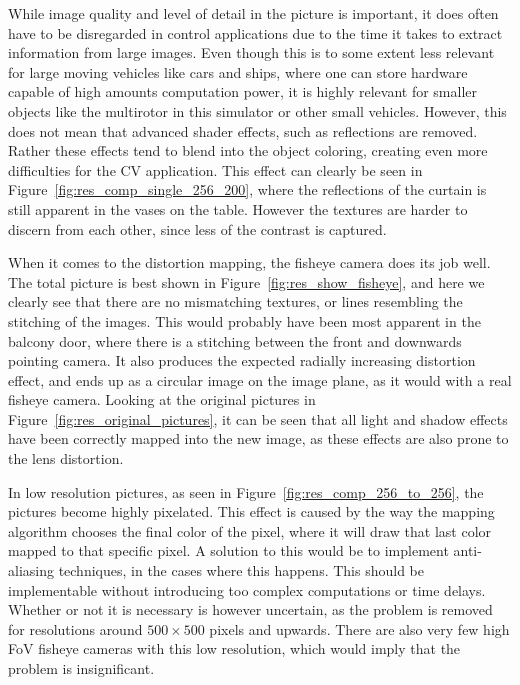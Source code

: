 While image quality and level of detail in the picture is important, it does often have to be disregarded in control applications due to the time it takes to extract information from large images. Even though this is to some extent less relevant for large moving vehicles like cars and ships, where one can store hardware capable of high amounts computation power, it is highly relevant for smaller objects like the multirotor in this simulator or other small vehicles. However, this does not mean that advanced shader effects, such as reflections are removed. Rather these effects tend to blend into the object coloring, creating even more difficulties for the CV application. This effect can clearly be seen in Figure~\ref{fig:res_comp_single_256_200}, where the reflections of the curtain is still apparent in the vases on the table. However the textures are harder to discern from each other, since less of the contrast is captured.

When it comes to the distortion mapping, the fisheye camera does its job well. The total picture is best shown in Figure~\ref{fig:res_show_fisheye}, and here we clearly see that there are no mismatching textures, or lines resembling the stitching of the images. This would probably have been most apparent in the balcony door, where there is a stitching between the front and downwards pointing camera. It also produces the expected radially increasing distortion effect, and ends up as a circular image on the image plane, as it would with a real fisheye camera. Looking at the original pictures in Figure~\ref{fig:res_original_pictures}, it can be seen that all light and shadow effects have been correctly mapped into the new image, as these effects are also prone to the lens distortion. 

In low resolution pictures, as seen in Figure~\ref{fig:res_comp_256_to_256}, the pictures become highly pixelated. This effect is caused by the way the mapping algorithm chooses the final color of the pixel, where it will draw that last color mapped to that specific pixel. A solution to this would be to implement anti-aliasing techniques, in the cases where this happens. This should be implementable without introducing too complex computations or time delays. Whether or not it is necessary is however uncertain, as the problem is removed for resolutions around $500\times 500$ pixels and upwards. There are also very few high FoV fisheye cameras with this low resolution, which would imply that the problem is insignificant.


